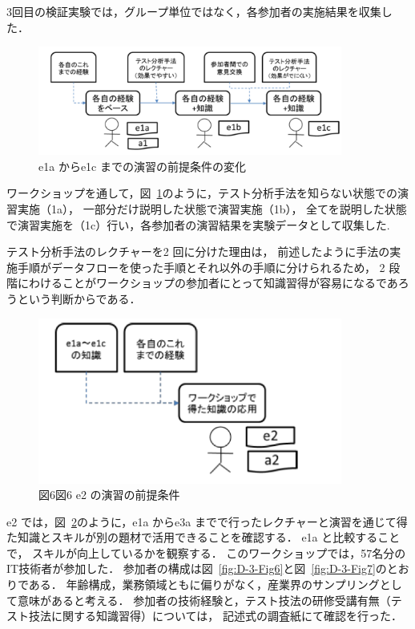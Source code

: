 3回目の検証実験では，グループ単位ではなく，各参加者の実施結果を収集した．
\begin{figure}[h]
\begin{center}
\includegraphics[width=10cm]{./image/D-3-Fig8.png}
\caption{e1a からe1c までの演習の前提条件の変化}
\label{fig:D-3-Fig8}
\end{center}
\end{figure}
ワークショップを通して，図~\ref{fig:D-3-Fig8}のように，テスト分析手法を知らない状態での演習実施（1a），
一部分だけ説明した状態で演習実施（1b），
全てを説明した状態で演習実施を（1c）行い，各参加者の演習結果を実験データとして収集した.

テスト分析手法のレクチャーを2 回に分けた理由は， 前述したように手法の実施手順がデータフローを使った手順とそれ以外の手順に分けられるため， 2 段階にわけることがワークショップの参加者にとって知識習得が容易になるであろうという判断からである．

\begin{figure}[h]
\begin{center}
\includegraphics[width=10cm]{./image/D-3-Fig9.png}
\caption{図6図6 e2 の演習の前提条件}
\label{fig:D-3-Fig9}
\end{center}
\end{figure}
e2 では，図~\ref{fig:D-3-Fig9}のように，e1a からe3a までで行ったレクチャーと演習を通じて得た知識とスキルが別の題材で活用できることを確認する． e1a と比較することで， スキルが向上しているかを観察する．
このワークショップでは，57名分のIT技術者が参加した．
参加者の構成は図~\ref{fig:D-3-Fig6}と図~\ref{fig:D-3-Fig7}のとおりである．
年齢構成，業務領域ともに偏りがなく，産業界のサンプリングとして意味があると考える．
参加者の技術経験と，テスト技法の研修受講有無（テスト技法に関する知識習得）については， 記述式の調査紙にて確認を行った．

